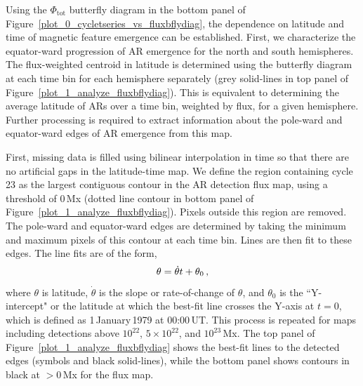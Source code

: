 Using the $\Phi_{\mathrm{tot}}$ butterfly diagram in the bottom panel of Figure~\ref{plot_0_cycletseries_vs_fluxbflydiag}, the dependence on latitude and time of magnetic feature emergence can be established. First, we characterize the equator-ward progression of \gls{AR} emergence for the north and south hemispheres. The flux-weighted centroid in latitude is determined using the butterfly diagram at each time bin for each hemisphere separately (grey solid-lines in top panel of Figure~\ref{plot_1_analyze_fluxbflydiag}). This is equivalent to determining the average latitude of ARs over a time bin, weighted by flux, for a given hemisphere. Further processing is required to extract information about the pole-ward and equator-ward edges of \gls{AR} emergence from this map. 

First, missing data is filled using bilinear interpolation in time so that there are no artificial gaps in the latitude-time map. We define the region containing cycle 23 as the largest contiguous contour in the \gls{AR} detection flux map, using a threshold of 0\,Mx (dotted line contour in bottom panel of Figure~\ref{plot_1_analyze_fluxbflydiag}). Pixels outside this region are removed. The pole-ward and equator-ward edges are determined by taking the minimum and maximum pixels of this contour at each time bin. Lines are then fit to these edges. 
The line fits are of the form,
\begin{equation}
\theta=\dot{\theta} t+\theta_{0} \mbox{\,,}
\end{equation}
where $\theta$ is latitude, $\dot{\theta}$ is the slope or rate-of-change of $\theta$, and $\theta_{0}$ is the ``Y-intercept" or the latitude at which the best-fit line crosses the Y-axis at $t=0$, which is defined as 1\,January\,1979 at 00:00\,UT.
This process is repeated for maps including detections above $10^{22}$, $5\times10^{22}$, and $10^{23}$\,Mx. The top panel of Figure~\ref{plot_1_analyze_fluxbflydiag} shows the best-fit lines to the detected edges (symbols and black solid-lines), while the bottom panel shows contours in black at $>$0\,Mx for the flux map.  

